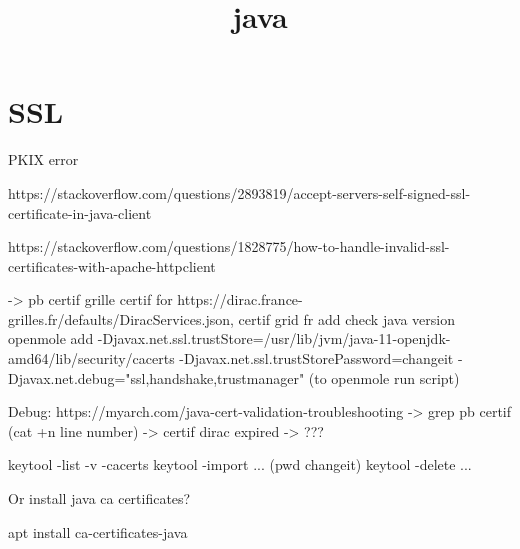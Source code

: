 


\title{java}


\date{}


\maketitle

\justify

\renewcommand{\abstractname}{}

\begin{abstract}

\end{abstract}


\section*{SSL}

PKIX error

https://stackoverflow.com/questions/2893819/accept-servers-self-signed-ssl-certificate-in-java-client

https://stackoverflow.com/questions/1828775/how-to-handle-invalid-ssl-certificates-with-apache-httpclient

-> pb certif grille
certif for https://dirac.france-grilles.fr/defaults/DiracServices.json, certif grid fr
add check java version openmole
add -Djavax.net.ssl.trustStore=/usr/lib/jvm/java-11-openjdk-amd64/lib/security/cacerts -Djavax.net.ssl.trustStorePassword=changeit -Djavax.net.debug="ssl,handshake,trustmanager"
(to openmole run script)

Debug: https://myarch.com/java-cert-validation-troubleshooting
-> grep pb certif 
(cat +n line number)
-> certif dirac expired -> ???

keytool -list -v -cacerts
keytool -import ... (pwd changeit)
keytool -delete ...

Or install java ca certificates?

apt install ca-certificates-java




%
%



